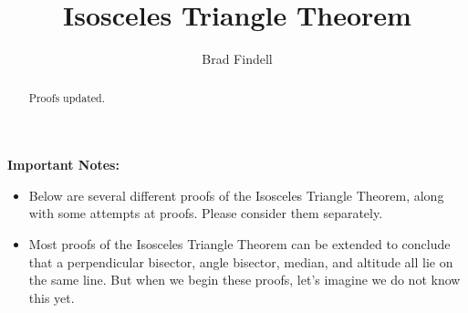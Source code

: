 \documentclass[nooutcomes]{ximera}
\title{Isosceles Triangle Theorem}
\author{Brad Findell}
\begin{document}
\begin{abstract}
Proofs updated. 
\end{abstract}
\maketitle

%
%

\textbf{Important Notes:}
\begin{itemize}
\item Below are several different proofs of the Isosceles Triangle Theorem, along with some attempts at proofs.  Please consider them separately.
\item Most proofs of the Isosceles Triangle Theorem can be extended to conclude that a perpendicular bisector, angle bisector, median, and altitude all lie on the same line.  But when we begin these proofs, let's imagine we do not know this yet.
\end{itemize}
\end{document}
